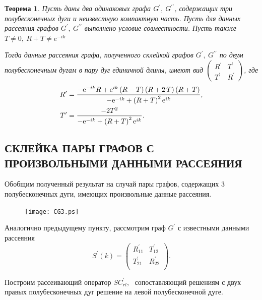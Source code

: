 \documentclass[a4 paper, 12 pt]{extarticle}
\newtheorem{theorem}{Теорема}[section]
\begin{document}
   \begin{theorem}
   	Пусть даны два одинаковых графа $G^\prime, \ G^{\prime\prime}$, содержащих три полубесконечных дуги и неизвестную компактную часть. Пусть для данных рассеяния графов  $G^\prime, \ G^{\prime\prime}$ выполнено условие совместности. Пусть также $T \neq 0, \ R+T \neq e^{-ik}$
   	
   	Тогда данные рассеяния графа, полученного склейкой графов $G^\prime, \ G^{\prime\prime}$ по двум полубесконечным дугам в пару дуг единичной длины, имеют вид $\left(\begin{matrix}
   	R^\prime & T^\prime \\
   	T^\prime & R^\prime
   	\end{matrix}\right)$, где
   	\[
   	\begin{aligned}
   	R^\prime &= {\frac {-{{\rm e}^{-ik}}R+{{\rm e}^{ik}} \left( R-T \right)  \left( R+
		2\,T \right)  \left( R+T \right) }{-{{\rm e}^{-ik}}+ \left(R+T\right)^2 {{\rm e}^{ik}}}}, \\
    T^\prime &= {\frac {-2{T}^{2}}{-{{\rm e}^{-ik}}+ \left(R+T\right)^2 {{\rm e}^{ik}}}}.
   	\end{aligned}\]
   \end{theorem}

   \subsection{СКЛЕЙКА ПАРЫ ГРАФОВ С ПРОИЗВОЛЬНЫМИ ДАННЫМИ РАССЕЯНИЯ}
   
   Обобщим полученный результат на случай пары графов, содержащих 3 полубесконечных дуги, имеющих произвольные данные рассеяния.
   
   \begin{figure}[!htb]
   	\centering
   	\texttt{[image: CG3.ps]}
   \end{figure}
   
   Аналогично предыдущему пункту, рассмотрим граф $G^\prime$ с известными данными рассеяния 
   \[
      S^\prime(k)=\left(%
   \begin{array}{cc}
   R_{11}^\prime & T_{12}^\prime \\
   T_{21}^\prime & R_{22}^\prime \\
   \end{array}%
   \right).
   \]
   
   Построим рассеивающий оператор $SC_{rl}^\prime$, \ сопоставляющий решениям с двух правых полубесконечных дуг решение на левой полубесконечной дуге.
   
\end{document}

